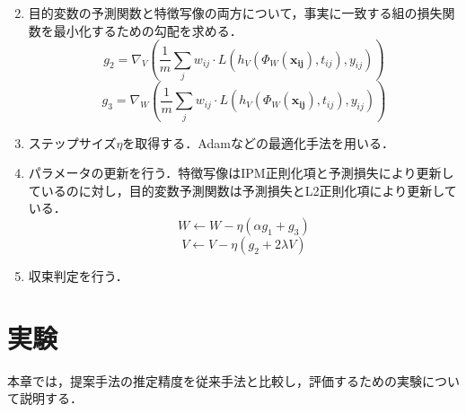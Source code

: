 \documentclass[dvipdfmx]{jreport}
\begin{document}
\begin{tcolorbox}[title=\textbf{CFRアルゴリズム}]
\begin{enumerate}
\begin{equation}
        \end{equation}
        \item 目的変数の予測関数と特徴写像の両方について，事実に一致する組の損失関数を最小化するための勾配を求める．
        \begin{equation}
            g_2 = \nabla_V \left( \frac{1}{m} \sum_j w_{ij} \cdot L(h_V(\Phi_W(\boldsymbol{x_{ij}}), t_{ij}), y_{ij}) \right)
            \end{equation}
            \begin{equation}
            g_3 = \nabla_W \left( \frac{1}{m} \sum_j w_{ij} \cdot L(h_V(\Phi_W(\boldsymbol{x_{ij}}), t_{ij}), y_{ij}) \right)
            \end{equation}
        \item ステップサイズ$\eta$を取得する．Adamなどの最適化手法を用いる．
        \item パラメータの更新を行う．特徴写像はIPM正則化項と予測損失により更新しているのに対し，目的変数予測関数は予測損失とL2正則化項により更新している．
        \begin{equation}
            W \leftarrow W - \eta \left( \alpha g_1 + g_3 \right)
            \end{equation}
            \begin{equation}
            V \leftarrow V - \eta \left( g_2 + 2\lambda V \right)
            \end{equation}
        \item 収束判定を行う．
    \end{enumerate}
\end{tcolorbox}

\section{実験}
本章では，提案手法の推定精度を従来手法と比較し，評価するための実験について説明する．
\end{document}
